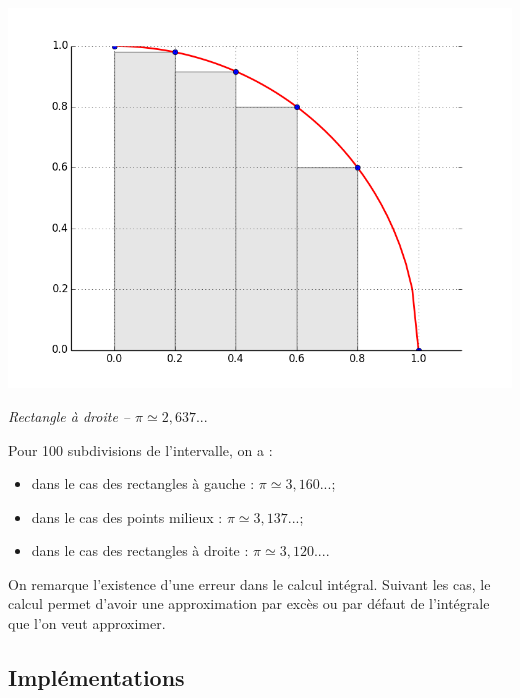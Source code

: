 \documentclass[10pt]{article}
\begin{document}
\begin{minipage}[c]{.32\linewidth}
\begin{center}
\includegraphics[width=.99\textwidth]{images/CourbesPython/pi_rect_d}

\textit{Rectangle à droite -- $\pi \simeq 2,637...$}
\end{center}
\end{minipage}

Pour 100 subdivisions de l'intervalle, on a :
\begin{itemize}
\item dans le cas des rectangles à gauche : $\pi\simeq 3,160...$;
\item dans le cas des points milieux : $\pi\simeq 3,137...$;
\item dans le cas des rectangles à droite : $\pi\simeq 3,120...$.
\end{itemize}


\begin{rem}
On remarque l'existence d'une erreur dans le calcul intégral. Suivant les cas, le calcul permet d'avoir une approximation par excès ou par défaut de l'intégrale que l'on veut approximer. 
\end{rem}



\subsection{Implémentations}
\end{document}
